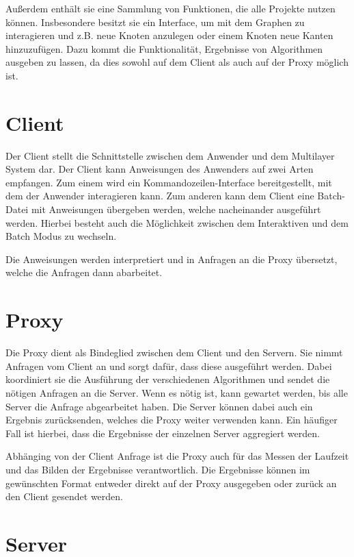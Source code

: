 Außerdem enthält sie eine Sammlung von Funktionen, die alle Projekte nutzen können. Insbesondere besitzt sie ein Interface, um mit dem Graphen zu interagieren und z.B. neue Knoten anzulegen oder einem Knoten neue Kanten hinzuzufügen.
Dazu kommt die Funktionalität, Ergebnisse von Algorithmen ausgeben zu lassen, da dies sowohl auf dem Client als auch auf der Proxy möglich ist.


\section{Client}

Der Client stellt die Schnittstelle zwischen dem Anwender und dem Multilayer System dar. Der Client kann Anweisungen des Anwenders auf zwei Arten empfangen.
Zum einem wird ein Kommandozeilen-Interface bereitgestellt, mit dem der Anwender interagieren kann. Zum anderen kann dem Client eine Batch-Datei mit Anweisungen übergeben werden,
welche nacheinander ausgeführt werden.
Hierbei besteht auch die Möglichkeit zwischen dem Interaktiven und dem Batch Modus zu wechseln.

Die Anweisungen werden interpretiert und in Anfragen an die Proxy übersetzt, welche die Anfragen dann abarbeitet.

\section{Proxy}

Die Proxy dient als Bindeglied zwischen dem Client und den Servern. Sie nimmt Anfragen vom Client an und sorgt dafür, dass diese ausgeführt werden.
Dabei koordiniert sie die Ausführung der verschiedenen Algorithmen und sendet die nötigen Anfragen an die Server. Wenn es nötig ist, kann gewartet werden,
bis alle Server die Anfrage abgearbeitet haben. Die Server können dabei auch ein Ergebnis zurücksenden, welches die Proxy weiter verwenden kann. Ein häufiger Fall
ist hierbei, dass die Ergebnisse der einzelnen Server aggregiert werden.


Abhänging von der Client Anfrage ist die Proxy auch für das Messen der Laufzeit und das Bilden der Ergebnisse verantwortlich. Die Ergebnisse können im gewünschten Format entweder direkt auf der Proxy ausgegeben
oder zurück an den Client gesendet werden.

\section{Server}

